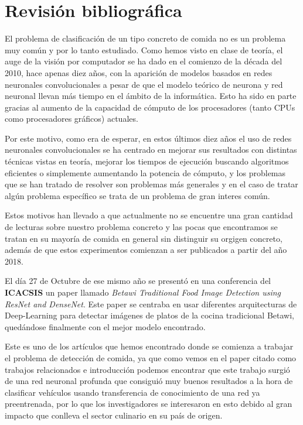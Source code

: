 \section{Revisión bibliográfica}

El problema de clasificación de un tipo concreto de comida no es un problema muy común y por lo tanto estudiado. Como hemos visto en clase de teoría, el auge de la visión por computador se ha dado en el comienzo de la década del 2010, hace apenas diez años, con la aparición de modelos basados en redes neuronales convolucionales a pesar de que el modelo teórico de neurona y red neuronal llevan más tiempo en el ámbito de la informática. Esto ha sido en parte gracias al aumento de la capacidad de cómputo de los procesadores (tanto CPUs como procesadores gráficos) actuales.

Por este motivo, como era de esperar, en estos últimos diez años el uso de redes neuronales convolucionales se ha centrado en mejorar sus resultados con distintas técnicas vistas en teoría, mejorar los tiempos de ejecución buscando algoritmos eficientes o simplemente aumentando la potencia de cómputo, y los problemas que se han tratado de resolver son problemas más generales y en el caso de tratar algún problema específico se trata de un problema de gran interes común.

Estos motivos han llevado a que actualmente no se encuentre una gran cantidad de lecturas sobre nuestro problema concreto y las pocas que encontramos se tratan en su mayoría de comida en general sin distinguir su orgigen concreto, además de que estos experimentos comienzan a ser publicados a partir del año 2018.

El día 27 de Octubre de ese mismo año se presentó en una conferencia del \textbf{ICACSIS} un paper llamado \textit{Betawi Traditional Food Image Detection using
ResNet and DenseNet}. Este paper se centraba en usar diferentes arquitecturas de Deep-Learning para detectar imágenes de platos de la cocina tradicional Betawi, quedándose finalmente con el mejor modelo encontrado.

Este es uno de los artículos que hemos encontrado donde se comienza a trabajar el problema de detección de comida, ya que como vemos en el paper citado como trabajos relacionados e introducción podemos encontrar que este trabajo surgió de una red neuronal profunda que consiguió muy buenos resultados a la hora de clasificar vehículos usando transferencia de conocimiento de una red ya preentrenada, por lo que los investigadores se interesaron en esto debido al gran impacto que conlleva el sector culinario en su país de origen.

